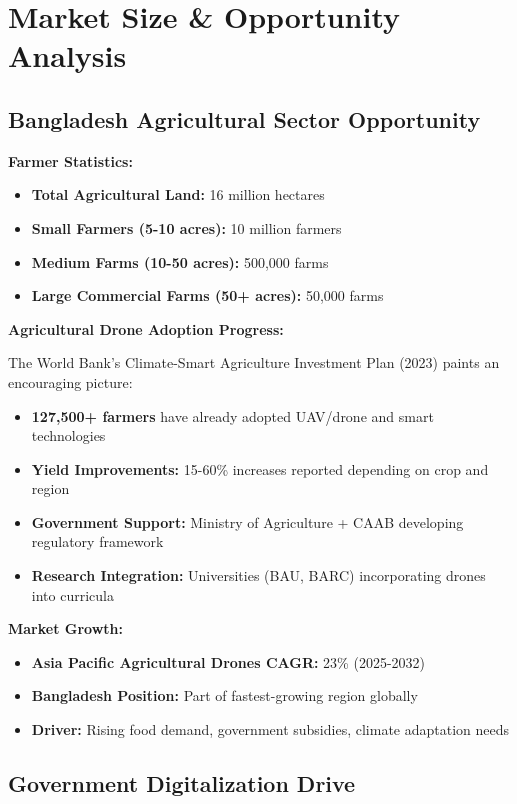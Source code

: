 \section{Market Size \& Opportunity Analysis}

\subsection{Bangladesh Agricultural Sector Opportunity}

\textbf{Farmer Statistics:}
\begin{itemize}
    \item \textbf{Total Agricultural Land:} 16 million hectares
    \item \textbf{Small Farmers (5-10 acres):} 10 million farmers
    \item \textbf{Medium Farms (10-50 acres):} 500,000 farms
    \item \textbf{Large Commercial Farms (50+ acres):} 50,000 farms
\end{itemize}

\textbf{Agricultural Drone Adoption Progress:}

The World Bank's Climate-Smart Agriculture Investment Plan (2023) paints an encouraging picture:
\begin{itemize}
    \item \textcolor{AccentGreen}{\textbf{127,500+ farmers}} have already adopted UAV/drone and smart technologies
    \item \textbf{Yield Improvements:} 15-60\% increases reported depending on crop and region
    \item \textbf{Government Support:} Ministry of Agriculture + CAAB developing regulatory framework
    \item \textbf{Research Integration:} Universities (BAU, BARC) incorporating drones into curricula
\end{itemize}

\textbf{Market Growth:}
\begin{itemize}
    \item \textbf{Asia Pacific Agricultural Drones CAGR:} 23\% (2025-2032)
    \item \textbf{Bangladesh Position:} Part of fastest-growing region globally
    \item \textbf{Driver:} Rising food demand, government subsidies, climate adaptation needs
\end{itemize}

\subsection{Government Digitalization Drive}

